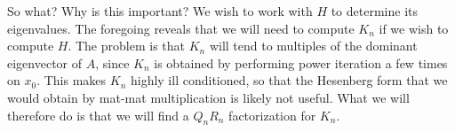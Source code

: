 \documentclass[../main.tex]{subfiles}
\begin{document}
\begin{remark}
    So what? Why is this important? We wish to work with $H$ to determine its eigenvalues.
    The foregoing reveals that we will need to compute $K_n$ if we wish to compute $H$. The problem is that $K_n$ will tend to multiples of the dominant eigenvector of $A$, since $K_n$ is obtained by performing power iteration a few times on $x_0$. This makes $K_n$ highly ill conditioned, so that the Hesenberg form that we would obtain by mat-mat multiplication is likely not useful. What we will therefore do is that we will find a $Q_nR_n$ factorization for $K_n$.
\end{remark}
\end{document}
